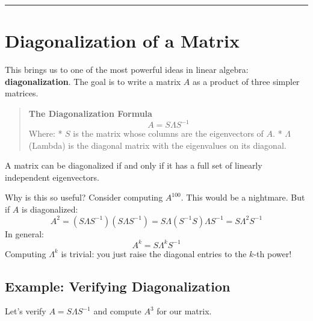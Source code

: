 \documentclass[
  letterpaper,
  DIV=11,
  numbers=noendperiod]{scrreprt}
\begin{document}
\begin{center}\rule{0.5\linewidth}{0.5pt}\end{center}

\section{Diagonalization of a Matrix}\label{diagonalization-of-a-matrix}

This brings us to one of the most powerful ideas in linear algebra:
\textbf{diagonalization}. The goal is to write a matrix \(A\) as a
product of three simpler matrices.

\begin{quote}
\textbf{The Diagonalization Formula} \[ A = S \Lambda S^{-1} \] Where: *
\(S\) is the matrix whose columns are the eigenvectors of \(A\). *
\(\Lambda\) (Lambda) is the diagonal matrix with the eigenvalues on its
diagonal.
\end{quote}

A matrix can be diagonalized if and only if it has a full set of
linearly independent eigenvectors.

Why is this so useful? Consider computing \(A^{100}\). This would be a
nightmare. But if \(A\) is diagonalized:
\[ A^2 = (S \Lambda S^{-1})(S \Lambda S^{-1}) = S \Lambda (S^{-1}S) \Lambda S^{-1} = S \Lambda^2 S^{-1} \]
In general: \[ A^k = S \Lambda^k S^{-1} \] Computing \(\Lambda^k\) is
trivial: you just raise the diagonal entries to the \(k\)-th power!

\subsection{Example: Verifying
Diagonalization}\label{example-verifying-diagonalization}

Let's verify \(A = S \Lambda S^{-1}\) and compute \(A^3\) for our
matrix.
\end{document}

